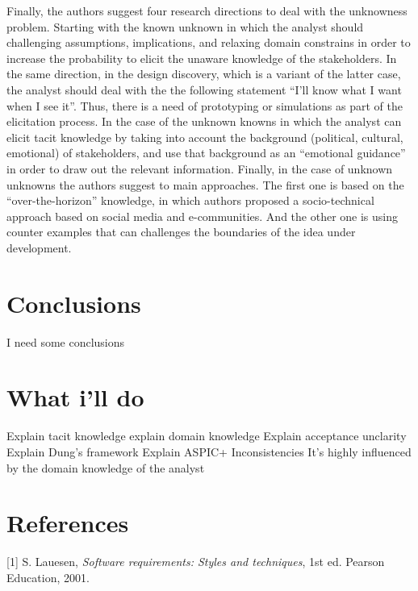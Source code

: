 \documentclass[]{llncs}
\begin{document}
Finally, the authors suggest four research directions to deal with the
unknowness problem. Starting with the known unknown in which the analyst
should challenging assumptions, implications, and relaxing domain
constrains in order to increase the probability to elicit the unaware
knowledge of the stakeholders. In the same direction, in the design
discovery, which is a variant of the latter case, the analyst should
deal with the the following statement ``I'll know what I want when I see
it''. Thus, there is a need of prototyping or simulations as part of the
elicitation process. In the case of the unknown knowns in which the
analyst can elicit tacit knowledge by taking into account the background
(political, cultural, emotional) of stakeholders, and use that
background as an ``emotional guidance'' in order to draw out the
relevant information. Finally, in the case of unknown unknowns the
authors suggest to main approaches. The first one is based on the
``over-the-horizon'' knowledge, in which authors proposed a
socio-technical approach based on social media and e-communities. And
the other one is using counter examples that can challenges the
boundaries of the idea under development.

\hypertarget{conclusions}{%
\section{Conclusions}\label{conclusions}}

I need some conclusions

\hypertarget{what-ill-do}{%
\section{What i'll do}\label{what-ill-do}}

Explain tacit knowledge explain domain knowledge Explain acceptance
unclarity Explain Dung's framework Explain ASPIC+ Inconsistencies It's
highly influenced by the domain knowledge of the analyst

\newpage

\hypertarget{references}{%
\section*{References}\label{references}}

\hypertarget{refs}{}
\leavevmode\hypertarget{ref-lauesen2001softwarereq}{}%
{[}1{]} S. Lauesen, \emph{Software requirements: Styles and techniques},
1st ed. Pearson Education, 2001.
\end{document}
